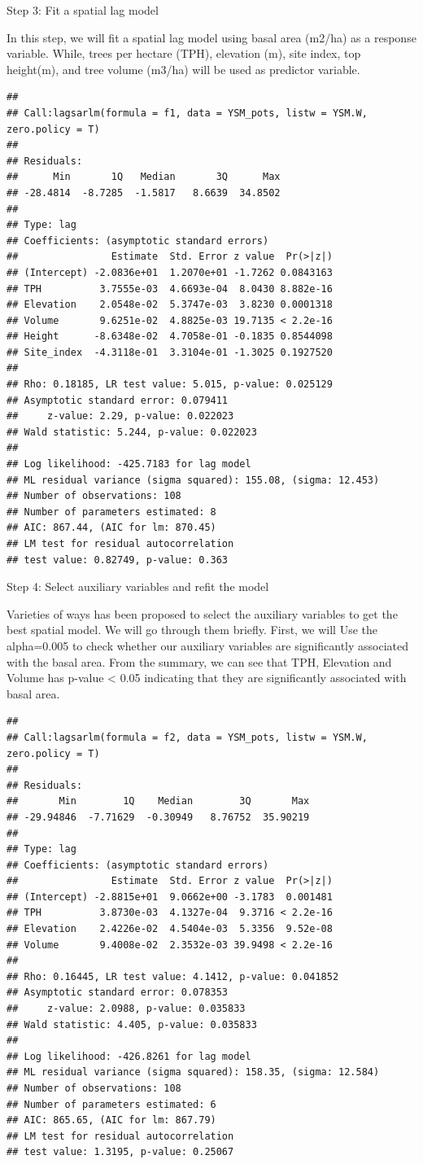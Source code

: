 \documentclass[
]{book}
\begin{document}
Step 3: Fit a spatial lag model

In this step, we will fit a spatial lag model using basal area (m2/ha) as a response variable. While, trees per hectare (TPH), elevation (m), site index, top height(m), and tree volume (m3/ha) will be used as predictor variable.

\begin{verbatim}
## 
## Call:lagsarlm(formula = f1, data = YSM_pots, listw = YSM.W, zero.policy = T)
## 
## Residuals:
##      Min       1Q   Median       3Q      Max 
## -28.4814  -8.7285  -1.5817   8.6639  34.8502 
## 
## Type: lag 
## Coefficients: (asymptotic standard errors) 
##                Estimate  Std. Error z value  Pr(>|z|)
## (Intercept) -2.0836e+01  1.2070e+01 -1.7262 0.0843163
## TPH          3.7555e-03  4.6693e-04  8.0430 8.882e-16
## Elevation    2.0548e-02  5.3747e-03  3.8230 0.0001318
## Volume       9.6251e-02  4.8825e-03 19.7135 < 2.2e-16
## Height      -8.6348e-02  4.7058e-01 -0.1835 0.8544098
## Site_index  -4.3118e-01  3.3104e-01 -1.3025 0.1927520
## 
## Rho: 0.18185, LR test value: 5.015, p-value: 0.025129
## Asymptotic standard error: 0.079411
##     z-value: 2.29, p-value: 0.022023
## Wald statistic: 5.244, p-value: 0.022023
## 
## Log likelihood: -425.7183 for lag model
## ML residual variance (sigma squared): 155.08, (sigma: 12.453)
## Number of observations: 108 
## Number of parameters estimated: 8 
## AIC: 867.44, (AIC for lm: 870.45)
## LM test for residual autocorrelation
## test value: 0.82749, p-value: 0.363
\end{verbatim}

Step 4: Select auxiliary variables and refit the model

Varieties of ways has been proposed to select the auxiliary variables to get the best spatial model. We will go through them briefly. First, we will Use the alpha=0.005 to check whether our auxiliary variables are significantly associated with the basal area. From the summary, we can see that TPH, Elevation and Volume has p-value \textless{} 0.05 indicating that they are significantly associated with basal area.

\begin{verbatim}
## 
## Call:lagsarlm(formula = f2, data = YSM_pots, listw = YSM.W, zero.policy = T)
## 
## Residuals:
##       Min        1Q    Median        3Q       Max 
## -29.94846  -7.71629  -0.30949   8.76752  35.90219 
## 
## Type: lag 
## Coefficients: (asymptotic standard errors) 
##                Estimate  Std. Error z value  Pr(>|z|)
## (Intercept) -2.8815e+01  9.0662e+00 -3.1783  0.001481
## TPH          3.8730e-03  4.1327e-04  9.3716 < 2.2e-16
## Elevation    2.4226e-02  4.5404e-03  5.3356  9.52e-08
## Volume       9.4008e-02  2.3532e-03 39.9498 < 2.2e-16
## 
## Rho: 0.16445, LR test value: 4.1412, p-value: 0.041852
## Asymptotic standard error: 0.078353
##     z-value: 2.0988, p-value: 0.035833
## Wald statistic: 4.405, p-value: 0.035833
## 
## Log likelihood: -426.8261 for lag model
## ML residual variance (sigma squared): 158.35, (sigma: 12.584)
## Number of observations: 108 
## Number of parameters estimated: 6 
## AIC: 865.65, (AIC for lm: 867.79)
## LM test for residual autocorrelation
## test value: 1.3195, p-value: 0.25067
\end{verbatim}
\end{document}
